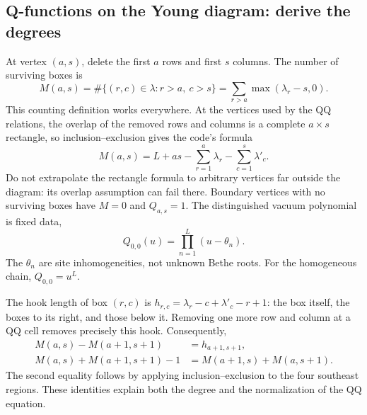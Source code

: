 \documentclass[11pt]{article}
\begin{document}
\subsection{Q-functions on the Young diagram: derive the degrees}

At vertex $(a,s)$, delete the first $a$ rows and first $s$ columns. The
number of surviving boxes is
\begin{equation}
 \label{eq:degree-count}
 M(a,s)=\#\{(r,c)\in\lambda:r>a,\ c>s\}
       =\sum_{r>a}\max(\lambda_r-s,0).
\end{equation}
This counting definition works everywhere. At the vertices used by the
QQ relations, the overlap of the removed rows and columns is a complete
$a\times s$ rectangle, so inclusion--exclusion gives the code's formula
\begin{equation}
 \label{eq:degree}
 M(a,s)=L+as-\sum_{r=1}^{a}\lambda_r-\sum_{c=1}^{s}\lambda'_c.
\end{equation}
Do not extrapolate the rectangle formula to arbitrary vertices far outside
the diagram: its overlap assumption can fail there. Boundary vertices
with no surviving boxes have $M=0$ and $Q_{a,s}=1$.
The distinguished vacuum polynomial is fixed data,
\begin{equation}
 \label{eq:vacuum}
 Q_{0,0}(u)=\prod_{n=1}^{L}(u-\theta_n).
\end{equation}
The $\theta_n$ are site inhomogeneities, not unknown Bethe roots.
For the homogeneous chain, $Q_{0,0}=u^L$.

The hook length of box $(r,c)$ is
$h_{r,c}=\lambda_r-c+\lambda'_c-r+1$: the box itself, the boxes to its
right, and those below it. Removing one more row and column at a QQ cell
removes precisely this hook. Consequently,
\begin{align}
 \label{eq:hook-degree}
 M(a,s)-M(a+1,s+1)&=h_{a+1,s+1},\\
 \label{eq:degree-balance}
 M(a,s)+M(a+1,s+1)-1&=M(a+1,s)+M(a,s+1).
\end{align}
The second equality follows by applying inclusion--exclusion to the
four southeast regions. These identities explain both the degree and
the normalization of the QQ equation.
\end{document}
